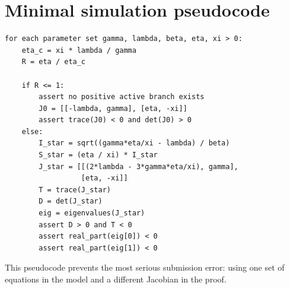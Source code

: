 \documentclass[11pt]{article}
\begin{document}
\section{Minimal simulation pseudocode}
\begin{verbatim}
for each parameter set gamma, lambda, beta, eta, xi > 0:
    eta_c = xi * lambda / gamma
    R = eta / eta_c

    if R <= 1:
        assert no positive active branch exists
        J0 = [[-lambda, gamma], [eta, -xi]]
        assert trace(J0) < 0 and det(J0) > 0
    else:
        I_star = sqrt((gamma*eta/xi - lambda) / beta)
        S_star = (eta / xi) * I_star
        J_star = [[(2*lambda - 3*gamma*eta/xi), gamma],
                  [eta, -xi]]
        T = trace(J_star)
        D = det(J_star)
        eig = eigenvalues(J_star)
        assert D > 0 and T < 0
        assert real_part(eig[0]) < 0
        assert real_part(eig[1]) < 0
\end{verbatim}
This pseudocode prevents the most serious submission error: using one set of equations in the model and a different Jacobian in the proof.
\end{document}
